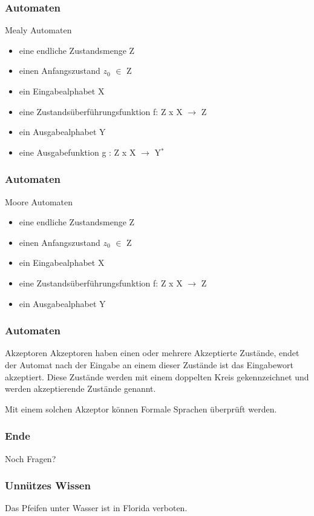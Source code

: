 \documentclass{beamer}
\begin{document}
\begin{frame}
	\frametitle{Automaten}
	\begin{block}{Mealy Automaten}
		\begin{itemize}
			\item eine endliche Zustandsmenge Z
			\item einen Anfangszustand $z_0$ $\in$ Z
			\item ein Eingabealphabet X
			\item eine Zustandsüberführungsfunktion f: Z x X $\rightarrow$ Z
			\item ein Ausgabealphabet Y
			\item eine Ausgabefunktion g : Z x X $\rightarrow$ Y$^\ast$
		\end{itemize}	
	\end{block}
\end{frame}

\begin{frame}
	\frametitle{Automaten}
	\begin{block}{Moore Automaten}		
		\begin{itemize}
			\item eine endliche Zustandsmenge Z
			\item einen Anfangszustand $z_0$ $\in$ Z
			\item ein Eingabealphabet X
			\item eine Zustandsüberführungsfunktion f: Z x X $\rightarrow$ Z
			\item ein Ausgabealphabet Y
		\end{itemize} 
	\end{block}
\end{frame}

\begin{frame}
	\frametitle{Automaten}
	\begin{block}{Akzeptoren}
		Akzeptoren haben einen oder mehrere Akzeptierte Zustände, endet der Automat nach der Eingabe an einem dieser Zustände ist das Eingabewort akzeptiert.
		Diese Zustände werden mit einem doppelten Kreis gekennzeichnet und werden akzeptierende Zustände genannt.
		
		Mit einem solchen Akzeptor können Formale Sprachen überprüft werden.
	\end{block}
\end{frame}

\begin {frame}
\frametitle {Ende}
	\begin {center}
		Noch Fragen?
	\end {center}
\end {frame}

\begin {frame}
\frametitle {Unnützes Wissen}
	\begin {center}
		Das Pfeifen unter Wasser ist in Florida verboten.
	\end {center}
\end {frame}
\end{document}
